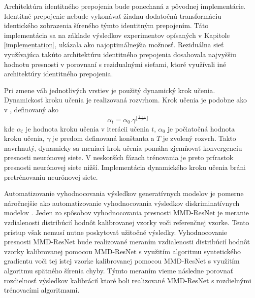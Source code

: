 Architektúra identitného prepojenia bude ponechaná z pôvodnej implementácie.
Identitné prepojenie nebude vykonávať žiadnu dodatočnú transformáciu identického zobrazenia šíreného týmto identitným prepojením. Táto implementácia sa na základe výsledkov experimentov opísaných v Kapitole \ref{implementation}, ukázala ako najoptimálnejšia možnosť. Reziduálna sieť využívajúca takúto architektúru identitného prepojenia dosahovala najvyššiu hodnotu presnosti v porovnaní s rezidualnými sieťami, ktoré využívali iné architektúry identitného prepojenia.


Pri zmene váh jednotlivých vrstiev je použitý dynamický krok učenia. Dynamickosť kroku učenia je realizovaná rozvrhom. Krok učenia je podobne ako v \cite{Li2017}, definovaný ako 
\begin{equation}
    \alpha_t = \alpha_0 . \gamma^{\lfloor\frac{1+t}{T}\rfloor}
\end{equation}
kde $\alpha_t$ je hodnota kroku učenia v iterácii učenia $t$, $\alpha_0$ je počiatočná hodnota kroku učenia, $\gamma$ je predom definovaná konštanta a $T$ je zvolený rozvrh. Takto navrhnutý, dynamicky sa meniaci krok učenia pomáha zjemňovať konvergenciu presnosti neurónovej siete. V neskorších fázach trénovania je preto prírastok presnosti neurónovej siete nižší. Implementácia dynamického kroku učenia bráni pretrénovaniu neurónovej siete.

Automatizovanie vyhodnocovania výsledkov generatívnych modelov je pomerne náročnejšie ako automatizovanie vyhodnocovania výsledkov diskriminatívnych modelov \cite{Bethge2016}. Jeden zo spôsobov vyhodnocovania presnosti MMD-ResNet je meranie vzdialenosti distribúcií hodnôt kalibrovanej vzorky voči referenčnej vzorke. Tento prístup však nemusí nutne poskytovať užitočné výsledky. Vyhodnocovanie presnosti MMD-ResNet bude realizované meraním vzdialenosti distribúcií hodnôt vzorky kalibrovanej pomocou MMD-ResNet s využitím algoritmu syntetického gradientu voči tej istej vzorke kalibrovanej pomocou MMD-ResNet s využitím algoritmu spätného šírenia chyby. Týmto meraním vieme následne porovnať rozdielnosť výsledkov kalibrácií ktoré boli realizované MMD-ResNet s rozdielnými trénovacími algoritmami.

